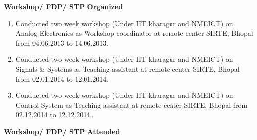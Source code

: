 %
%
%

\textbf{Workshop/ FDP/ STP Organized}
\begin{enumerate}
	
\item Conducted two week workshop (Under IIT kharagur and NMEICT) on Analog Electronics as Workshop coordinator at remote center SIRTE, Bhopal from 04.06.2013 to 14.06.2013.

\item Conducted two week workshop (Under IIT kharagur and NMEICT) on Signals \& Systems as Teaching assistant at remote center SIRTE, Bhopal from 02.01.2014 to 12.01.2014.	

\item Conducted two week workshop (Under IIT kharagur and NMEICT) on Control System as Teaching assistant at remote center SIRTE, Bhopal from 02.12.2014 to 12.12.2014..	
	
\end{enumerate}
\textbf{Workshop/ FDP/ STP Attended}
